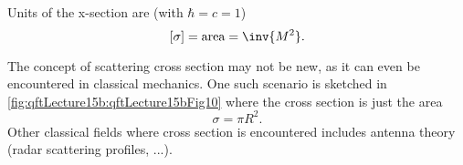 Units of the x-section are (with \( \hbar = c = 1 \))
\begin{equation}\label{eqn:qftLecture15b:480}
[\sigma] = \text{area} = \inv{M^2}.
\end{equation}

The concept of scattering cross section may not be new, as it can even be encountered in classical mechanics.  One such scenario is sketched in \cref{fig:qftLecture15b:qftLecture15bFig10} where the cross section is just the area
\begin{dmath}\label{eqn:qftLecture15b:500}
\sigma = \pi R^2.
\end{dmath}
Other classical fields where cross section is encountered includes antenna theory (radar scattering profiles, ...).


